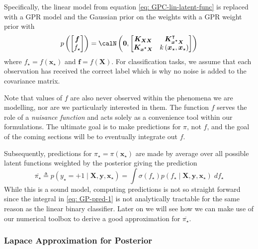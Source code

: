 Specifically, the linear model from equation \ref{eq: GPC-lin-latent-func} is replaced with a GPR model and the Gaussian prior on the weights with a GPR weight prior with
\begin{equation*}
    p \left(
    \begin{bmatrix}
            \bm{f} \\
            f_{\star}
        \end{bmatrix}
    \right)
    =
    \calN \left( \bm{0} ,
    \begin{bmatrix}
        \bm{K_{XX}}         & \bm{K_{x^{\star}X}}^{\intercal}                 \\
        \bm{K_{x^{\star}X}} & k \left( \bm{x}_{\star}, \bm{x}_{\star} \right)
    \end{bmatrix}
    \right)
\end{equation*}
where $f_{\star} = f ( \bm{x}_{\star} )$ and $\bm{f} = f \left( \bm{X} \right)$. For classification tasks, we assume that each observation has received the correct label which is why no noise is added to the covariance matrix.

Note that values of $f$ are also never observed within the phenomena we are modelling, nor are we particularly interested in them. The function $f$ serves the role of a {\it nuisance function} and acts solely as a convenience tool within our formulations. The ultimate goal is to make predictions for $\pi$, not $f$, and the goal of the coming sections will be to eventually integrate out $f$.

Subsequently, predictions for $\pi_{\star} = \pi \left( \bm{x}_{\star} \right)$ are made by average over all possible latent functions weighted by the posterior giving the prediction
\begin{equation} \label{eq: GP-pred-1}
    \overline{\pi_{\star}} \triangleq p \left( y_{\star} = +1 \mid \bm{X} , \bm{y} , \bm{x}_{\star} \right) = \int \sigma \left( f_{\star} \right) p \left( f_{\star} \mid \bm{X} , \bm{y} , \bm{x}_{\star} \right) \; d f_{\star}
\end{equation}
While this is a sound model, computing predictions is not so straight forward since the integral in \ref{eq: GP-pred-1} is not analytically tractable for the same reason as the linear binary classifier. Later on we will see how we can make use of our numerical toolbox to derive a good approximation for $\overline{\pi_{\star}}$.

\subsubsection{Lapace Approximation for Posterior}\label{Section1.6.2}

